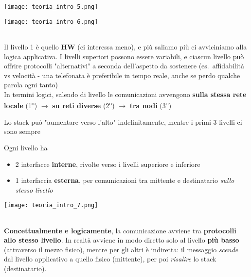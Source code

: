 \noindent\begin{minipage}[c]{.5\textwidth}
\texttt{[image: teoria\_intro\_5.png]}
\end{minipage}
\begin{minipage}[c]{.5\textwidth}
\texttt{[image: teoria\_intro\_6.png]}
\end{minipage}\\

Il livello 1 \`e quello \textbf{HW} (ci interessa meno), e pi\`u saliamo pi\`u ci avviciniamo alla logica applicativa. I livelli superiori possono essere variabili, e ciascun livello pu\`o offrire protocolli "alternativi" a seconda dell'aspetto da sostenere (es.~affidabilit\`a vs velocit\`a - una telefonata \`e preferibile in tempo reale, anche se perdo qualche parola ogni tanto)\\
In termini logici, salendo di livello le comunicazioni avvengono \textbf{sulla stessa rete locale} (1\textsuperscript{o}) $\rightarrow$ \textbf{su reti diverse} (2\textsuperscript{o}) $\rightarrow$ \textbf{tra nodi} (3\textsuperscript{o})

\begin{emphasize}
    Lo stack pu\`o "aumentare verso l'alto" indefinitamente, mentre i primi 3 livelli ci sono sempre
\end{emphasize}

\noindent\begin{minipage}[c]{.7\textwidth}
Ogni livello ha
\begin{itemize}
  \item 2 interfacce \textbf{interne}, rivolte verso i livelli superiore e inferiore
  \item 1 interfaccia \textbf{esterna}, per comunicazioni tra mittente e destinatario \textit{sullo stesso livello}
\end{itemize}
\end{minipage}
\begin{minipage}[c]{.3\textwidth}
\texttt{[image: teoria\_intro\_7.png]}
\end{minipage}\\

\textbf{Concettualmente e logicamente}, la comunicazione avviene tra \textbf{protocolli allo stesso livello}. In realt\`a avviene in modo diretto solo al livello \textbf{pi\`u basso} (attraverso il mezzo fisico), mentre per gli altri \`e indiretta: il messaggio \textit{scende} dal livello applicativo a quello fisico (mittente), per poi \textit{risalire} lo stack (destinatario).

